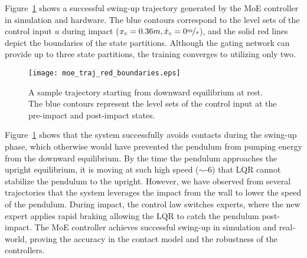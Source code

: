 Figure~\ref{fig:cartpole_trajectory} shows a successful swing-up trajectory
generated by the MoE controller in simulation and hardware.
%
The blue contours correspond to the level sets of the control input $u$ during
impact ($x_c=0.36m, \dot{x}_c = 0\nicefrac{m}{s}$), and the solid red lines
depict the boundaries of the state partitions.
%
Although the gating network can provide up to three state partitions,
the training converges to utilizing only two.
%
\begin{figure}[H]
    \centering
    \texttt{[image: moe\_traj\_red\_boundaries.eps]}
    \caption{A sample trajectory starting from
    downward equilibrium at rest. The blue contours represent the level sets of
    the control input at the pre-impact and post-impact states.}
    \label{fig:cartpole_trajectory}
\end{figure}
%
\noindent Figure~\ref{fig:cartpole_trajectory} shows that the system successfully avoids
contacts during the swing-up phase, which otherwise would have prevented the
pendulum from pumping energy from the downward equilibrium.
%
By the time the pendulum approaches the upright equilibrium, it is moving at
such high speed ($\sim$-6) that LQR cannot stabilize the
pendulum to the upright.
%
However, we have observed from several trajectories that the system leverages
the impact from the wall to lower the speed of the pendulum.
%
During impact, the control law switches experts, where the new expert applies
rapid braking allowing the LQR to catch the pendulum post-impact.
%
The MoE controller achieves successful swing-up in simulation and real-world,
proving the accuracy in the contact model and the robustness of the
controllers.

